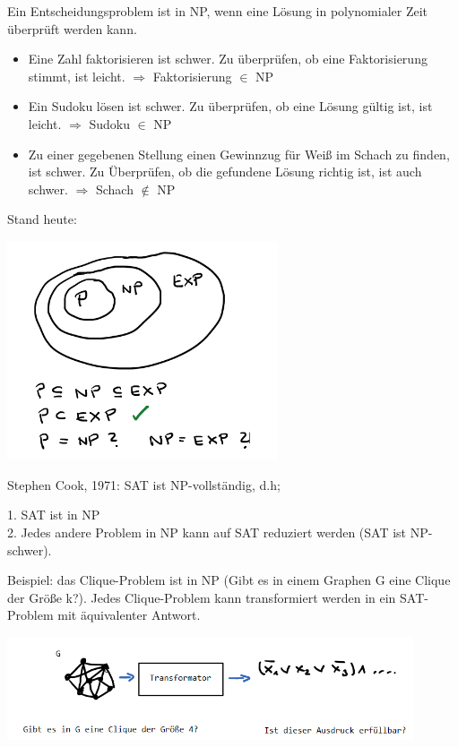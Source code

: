 \documentclass{beamer}
\begin{document}
\begin{frame}[fragile]

Ein Entscheidungsproblem ist in NP, wenn eine Lösung in polynomialer Zeit überprüft werden kann. \pause
\begin{itemize}
\item Eine Zahl faktorisieren ist schwer. Zu überprüfen, ob eine Faktorisierung stimmt, ist leicht. \pause
$\Rightarrow$  Faktorisierung  $\in$ NP

\item
 Ein Sudoku lösen ist schwer. Zu überprüfen, ob eine Lösung gültig ist, ist leicht.  \pause $\Rightarrow$  Sudoku  $\in$ NP
 
\item Zu einer gegebenen Stellung einen Gewinnzug für Weiß im Schach zu finden, ist schwer. Zu Überprüfen, ob die gefundene Lösung richtig ist, ist auch schwer. \pause $\Rightarrow$  Schach  $\notin$ NP
\end{itemize}
\end{frame}

\begin{frame}[fragile]
Stand heute: 

\includegraphics[width=8cm]{bild7.png}

\end{frame}



\begin{frame}[fragile]
Stephen Cook, 1971: SAT ist NP-vollständig, d.h;

1. SAT ist in NP \\
2. Jedes andere Problem in NP kann auf SAT reduziert werden (SAT ist NP-schwer).

Beispiel: das Clique-Problem ist in NP (Gibt es in einem Graphen G eine Clique der Größe k?). Jedes Clique-Problem kann transformiert werden in ein SAT-Problem mit äquivalenter Antwort.

\includegraphics[width=12cm]{bild9.png}

\end{frame}
\end{document}
